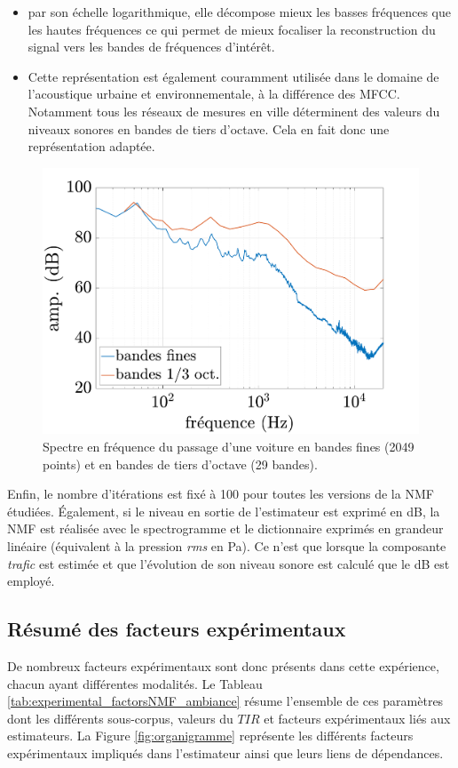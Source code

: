 \begin{itemize}
\item par son échelle logarithmique, elle décompose mieux les basses fréquences que les hautes fréquences ce qui permet de mieux focaliser la reconstruction du signal vers les bandes de fréquences d'intérêt.
\item Cette représentation est également couramment utilisée dans le domaine de l'acoustique urbaine et environnementale, à la différence des MFCC. Notamment tous les réseaux de mesures en ville déterminent des valeurs du niveaux sonores en bandes de tiers d'octave. Cela en fait donc une représentation adaptée.
\end{itemize}

\begin{figure}[h]
\centering
\includegraphics[width=0.5\linewidth]{./figures/NMF/bande_fine_tiers.pdf}
\caption{Spectre en fréquence du passage d'une voiture en bandes fines (2049 points) et en bandes de tiers d'octave (29 bandes).}
\label{fig:tiers_octaves}
\end{figure}

Enfin, le nombre d'itérations est fixé à 100 pour toutes les versions de la NMF étudiées. Également, si le niveau en sortie de l'estimateur est exprimé en dB, la NMF est réalisée avec le spectrogramme et le dictionnaire exprimés en grandeur linéaire (équivalent à la pression \textit{rms} en Pa). Ce n'est que lorsque la composante \textit{trafic} est estimée et que l'évolution de son niveau sonore est calculé que le dB est employé.

\subsection{Résumé des facteurs expérimentaux}

De nombreux facteurs expérimentaux sont donc présents dans cette expérience, chacun ayant différentes modalités. Le Tableau \ref{tab:experimental_factorsNMF_ambiance} résume l'ensemble de ces paramètres dont les différents sous-corpus, valeurs du $TIR$ et facteurs expérimentaux liés aux estimateurs. La Figure \ref{fig:organigramme} représente les différents facteurs expérimentaux impliqués dans l'estimateur ainsi que leurs liens de dépendances.

